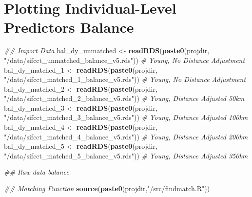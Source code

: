 \documentclass[
]{article}
\newenvironment{Shaded}{\begin{snugshade}}{\end{snugshade}}
\newcommand{\CommentTok}[1]{\textcolor[rgb]{0.56,0.35,0.01}{\textit{#1}}}
\newcommand{\DecValTok}[1]{\textcolor[rgb]{0.00,0.00,0.81}{#1}}
\newcommand{\KeywordTok}[1]{\textcolor[rgb]{0.13,0.29,0.53}{\textbf{#1}}}
\newcommand{\NormalTok}[1]{#1}
\newcommand{\StringTok}[1]{\textcolor[rgb]{0.31,0.60,0.02}{#1}}
\begin{document}
\hypertarget{plotting-individual-level-predictors-balance}{%
\section{Plotting Individual-Level Predictors
Balance}\label{plotting-individual-level-predictors-balance}}

\begin{Shaded}
\begin{Highlighting}[]
\CommentTok{## Import Data}
\NormalTok{bal_dy_unmatched <-}\StringTok{ }\KeywordTok{readRDS}\NormalTok{(}\KeywordTok{paste0}\NormalTok{(projdir, }\StringTok{"/data/sifcct_unmatched_balance_v5.rds"}\NormalTok{)) }\CommentTok{# Young, No Distance Adjustment}
\NormalTok{bal_dy_matched_}\DecValTok{1}\NormalTok{ <-}\StringTok{ }\KeywordTok{readRDS}\NormalTok{(}\KeywordTok{paste0}\NormalTok{(projdir, }\StringTok{"/data/sifcct_matched_1_balance_v5.rds"}\NormalTok{)) }\CommentTok{# Young, No Distance Adjustment}
\NormalTok{bal_dy_matched_}\DecValTok{2}\NormalTok{ <-}\StringTok{ }\KeywordTok{readRDS}\NormalTok{(}\KeywordTok{paste0}\NormalTok{(projdir, }\StringTok{"/data/sifcct_matched_2_balance_v5.rds"}\NormalTok{)) }\CommentTok{# Young, Distance Adjusted 50km}
\NormalTok{bal_dy_matched_}\DecValTok{3}\NormalTok{  <-}\StringTok{ }\KeywordTok{readRDS}\NormalTok{(}\KeywordTok{paste0}\NormalTok{(projdir, }\StringTok{"/data/sifcct_matched_3_balance_v5.rds"}\NormalTok{)) }\CommentTok{# Young, Distance Adjusted 100km}
\NormalTok{bal_dy_matched_}\DecValTok{4}\NormalTok{  <-}\StringTok{ }\KeywordTok{readRDS}\NormalTok{(}\KeywordTok{paste0}\NormalTok{(projdir, }\StringTok{"/data/sifcct_matched_4_balance_v5.rds"}\NormalTok{)) }\CommentTok{# Young, Distance Adjusted 200km}
\NormalTok{bal_dy_matched_}\DecValTok{5}\NormalTok{  <-}\StringTok{ }\KeywordTok{readRDS}\NormalTok{(}\KeywordTok{paste0}\NormalTok{(projdir, }\StringTok{"/data/sifcct_matched_5_balance_v5.rds"}\NormalTok{)) }\CommentTok{# Young, Distance Adjusted 350km}

\CommentTok{## Raw data balance}

\CommentTok{## Matching Function}
\KeywordTok{source}\NormalTok{(}\KeywordTok{paste0}\NormalTok{(projdir,}\StringTok{"/src/findmatch.R"}\NormalTok{))}


\end{Highlighting}
\end{Shaded}
\end{document}
